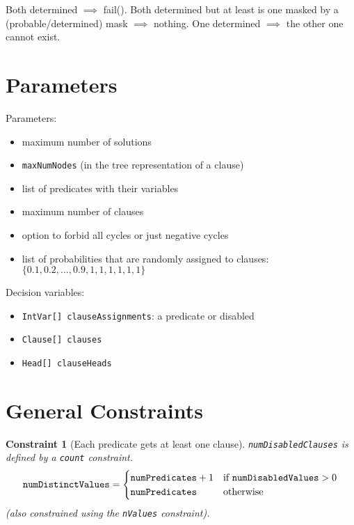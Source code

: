 \documentclass{article}
\newtheorem{constraint}{Constraint}
\theoremstyle{definition}
\newcommand{\variable}[1]{\texttt{\textup{#1}}}
\begin{document}
Both determined $\implies$ fail(). Both determined but at least is one masked by
a (probable/determined) mask $\implies$ nothing. One determined $\implies$ the
other one cannot exist.

\section{Parameters}

Parameters:
\begin{itemize}
\item maximum number of solutions
\item \variable{maxNumNodes} (in the tree representation of a clause)
\item list of predicates with their variables
\item maximum number of clauses
\item option to forbid all cycles or just negative cycles
\item list of probabilities that are randomly assigned to clauses: $\{ 0.1,
  0.2, \dots, 0.9, 1, 1, 1, 1, 1, 1 \}$
\end{itemize}

Decision variables: %
\begin{itemize}
\item \variable{IntVar[] clauseAssignments}: a predicate or disabled
\item \variable{Clause[] clauses}
\item \variable{Head[] clauseHeads}
\end{itemize}

\section{General Constraints}

\begin{constraint}[Each predicate gets at least one clause]
  \variable{numDisabledClauses} is defined by a \variable{count} constraint.
  \[
    \variable{numDistinctValues} =
    \begin{cases}
      \variable{numPredicates} + 1 & \text{if } \variable{numDisabledValues} > 0 \\
      \variable{numPredicates} & \text{otherwise}
    \end{cases}
  \]
  (also constrained using the \variable{nValues} constraint).
\end{constraint}
\end{document}
